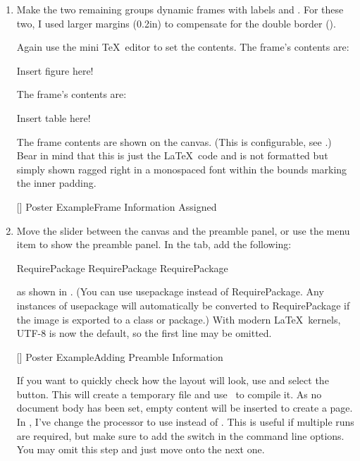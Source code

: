 \begin{enumerate}
\item  Make the two remaining groups dynamic frames
with labels  and . For these two, I used larger
margins (0.2in) to compensate for the double border
().

Again use the mini \TeX\ editor to set the contents. The 
frame's contents are:
\begin{compactcodebox}
Insert figure here!
\end{compactcodebox}%
The  frame's contents are:
\begin{compactcodebox}
Insert table here!
\end{compactcodebox}%
The frame contents are shown on the \gls{canvas}. (This is
configurable, see .) Bear in mind that
this is just the \LaTeX\ code and is not formatted but simply shown
ragged right in a monospaced font within the bounds marking the
inner padding.

[]
{}
{Poster Example\dash Frame Information Assigned}

\item Move the slider between the \gls{canvas} and the preamble
panel, or use the  menu item to
show the \gls{preamble} panel. In the 
tab, add the following:
\begin{compactcodebox}
\gls{RequirePackage}
\gls{RequirePackage}
\gls{RequirePackage}
\end{compactcodebox}
as shown in . (You can use
\gls{usepackage} instead of \gls{RequirePackage}. Any
instances of \gls{usepackage} will automatically be converted to
\gls{RequirePackage} if the image is exported to a class or
package.) With modern \LaTeX\ kernels, UTF-8 is now the default, so
the first line may be omitted.

[]
{}
{Poster Example\dash Adding Preamble Information}

If you want to quickly check how the layout will look, use
 and select the  button.
This will create a temporary file and use \pdfLaTeX\ to compile it.
As no document body has been set, empty content will be inserted to
create a page. In , I've change
the processor to use  instead of \pdfLaTeX. This is
useful if multiple runs are required, but make sure to add the
 switch in the command line options.
You may omit this step and just move onto the next one.


\end{enumerate}
